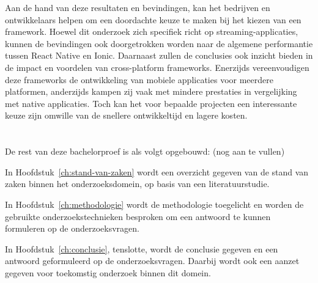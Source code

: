 Aan de hand van deze resultaten en bevindingen, kan het bedrijven en ontwikkelaars helpen om een doordachte keuze te maken bij het kiezen van een framework. Hoewel dit onderzoek zich specifiek richt op streaming-applicaties, kunnen de bevindingen ook doorgetrokken worden naar de algemene performantie tussen React Native en Ionic. Daarnaast zullen de conclusies ook inzicht bieden in de impact en voordelen van cross-platform frameworks. Enerzijds vereenvoudigen deze frameworks de ontwikkeling van mobiele applicaties voor meerdere platformen, anderzijds kampen zij vaak met mindere prestaties in vergelijking met native applicaties. Toch kan het voor bepaalde projecten een interessante keuze zijn omwille van de snellere ontwikkeltijd en lagere kosten.

\section{}%
\label{sec:opzet-bachelorproef}


De rest van deze bachelorproef is als volgt opgebouwd:   (nog aan te vullen)

In Hoofdstuk~\ref{ch:stand-van-zaken} wordt een overzicht gegeven van de stand van zaken binnen het onderzoeksdomein, op basis van een literatuurstudie.

In Hoofdstuk~\ref{ch:methodologie} wordt de methodologie toegelicht en worden de gebruikte onderzoekstechnieken besproken om een antwoord te kunnen formuleren op de onderzoeksvragen.


In Hoofdstuk~\ref{ch:conclusie}, tenslotte, wordt de conclusie gegeven en een antwoord geformuleerd op de onderzoeksvragen. Daarbij wordt ook een aanzet gegeven voor toekomstig onderzoek binnen dit domein.